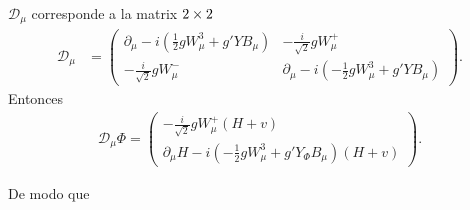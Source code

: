 \begin{frame}
$\mathcal{D}_\mu$ corresponde a la matrix $2\times  2$
\begin{align}
 \mathcal{D}_\mu &=  \begin{pmatrix}
    \partial_\mu-i\left(\frac{1}{2}g W^3_\mu+g' Y B_\mu\right)&-\frac{i}{\sqrt{2}}g W^+_\mu\\
    -\frac{i}{\sqrt{2}}g W^-_\mu&\partial_\mu-i\left(-\frac{1}{2}g W^3_\mu+g'Y B_\mu\right)
  \end{pmatrix}.
\end{align}
Entonces
\begin{align}
\mathcal{D}_\mu\Phi=\begin{pmatrix}
    -\frac{i}{\sqrt{2}}gW_\mu^+(H+v)\\
    \partial_\mu H-i\left(-\frac{1}{2}gW^3_\mu+g'Y_\Phi B_\mu\right)(H+v)
  \end{pmatrix}.
\end{align}

De modo que


\end{frame}
